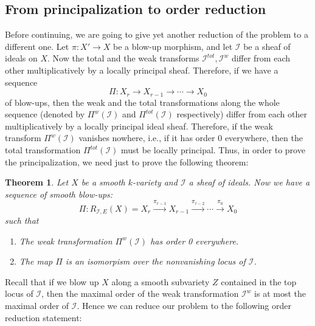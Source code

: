 \documentclass[12pt,a4paper,leqno]{article}
\theoremstyle{plain}
\newtheorem{thm}[theo]{Theorem}
\theoremstyle{definition}
\theoremstyle{remark}
\begin{document}
\subsection{From principalization to order reduction}

Before continuing, we are going to give yet another reduction of the problem to a different one. Let $\pi : X' \to X$ be a blow-up morphism, and let $\mathscr{I}$ be a sheaf of ideals on $X$. Now the total and the weak transforms $\mathscr{I}^{tot}, \mathscr{I}^{w}$ differ from each other multiplicatively by a locally principal sheaf. Therefore, if we have a sequence
\begin{equation*}
\Pi: X_r \to X_{r-1} \to \cdots \to X_0
\end{equation*}
of blow-ups, then the weak and the total transformations along the whole sequence (denoted by $\Pi^{w} (\mathscr{I})$ and $\Pi^{tot} (\mathscr{I})$ respectively) differ from each other multiplicatively by a locally principal ideal sheaf. Therefore, if the weak transform $\Pi^{w} (\mathscr{I})$ vanishes nowhere, i.e., if it has order 0 everywhere, then the total transformation $\Pi^{tot} (\mathscr{I})$ must be locally principal. Thus, in order to prove the principalization, we need just to prove the following theorem:

\begin{thm}
Let $X$ be a smooth $k$-variety and $\mathscr{I}$ a sheaf of ideals. Now we have a sequence of smooth blow-ups:
\begin{equation*}
\Pi: R_{\mathscr{I},E} (X) = X_r \stackrel{\pi_{r-1}}{\to} X_{r-1} \stackrel{\pi_{r-2}}{\to} \cdots \stackrel{\pi_{0}}{\to} X_0
\end{equation*}
such that
\begin{enumerate}
\item The weak transformation $\Pi^{w} (\mathscr{I})$ has order 0 everywhere.
\item The map $\Pi$ is an isomorpism over the nonvanishing locus of $\mathscr{I}$.
\end{enumerate}
\end{thm}

Recall that if we blow up $X$ along a smooth subvariety $Z$ contained in the top locus of $\mathscr{I}$, then the maximal order of the weak transformation $\mathscr{I}^w$ is at most the maximal order of $\mathscr{I}$. Hence we can reduce our problem to the following order reduction statement:
\end{document}
